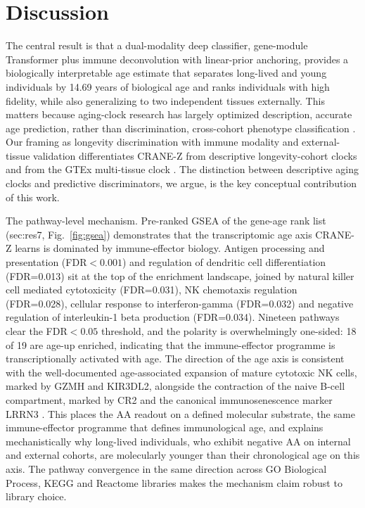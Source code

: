 \documentclass[11pt,a4paper]{article}
\begin{document}
\section{Discussion}\label{sec:disc}
The central result is that a dual-modality deep classifier, gene-module Transformer plus immune deconvolution with linear-prior anchoring, provides a biologically interpretable age estimate that separates long-lived and young individuals by 14.69 years of biological age and ranks individuals with high fidelity, while also generalizing to two independent tissues externally. This matters because aging-clock research has largely optimized description, accurate age prediction, rather than discrimination, cross-cohort phenotype classification \cite{mamoshina2019applications,frenk2021mechanistic,bergsma2021centenarian,liu2023immune,zhang2023clock}. Our framing as longevity discrimination with immune modality and external-tissue validation differentiates CRANE-Z from descriptive longevity-cohort clocks and from the GTEx multi-tissue clock \cite{orange2026brief}. The distinction between descriptive aging clocks and predictive discriminators, we argue, is the key conceptual contribution of this work.

The pathway-level mechanism. Pre-ranked GSEA of the gene-age rank list (sec:res7, Fig.~\ref{fig:gsea}) demonstrates that the transcriptomic age axis CRANE-Z learns is dominated by immune-effector biology. Antigen processing and presentation (FDR$<0.001$) and regulation of dendritic cell differentiation (FDR=0.013) sit at the top of the enrichment landscape, joined by natural killer cell mediated cytotoxicity (FDR=0.031), NK chemotaxis regulation (FDR=0.028), cellular response to interferon-gamma (FDR=0.032) and negative regulation of interleukin-1 beta production (FDR=0.034). Nineteen pathways clear the FDR$<0.05$ threshold, and the polarity is overwhelmingly one-sided: 18 of 19 are age-up enriched, indicating that the immune-effector programme is transcriptionally activated with age. The direction of the age axis is consistent with the well-documented age-associated expansion of mature cytotoxic NK cells, marked by GZMH and KIR3DL2, alongside the contraction of the naive B-cell compartment, marked by CR2 and the canonical immunosenescence marker LRRN3 \cite{franceschi2018inflammaging,goronzy2017fifty,fulop2018immunosenescence,nikolich2008ageing,pawelec2018conundrum,weng2006aging,shaw2010aging,solana2012innate,lopez2013hallmarks,lopez2023hallmarks}. This places the AA readout on a defined molecular substrate, the same immune-effector programme that defines immunological age, and explains mechanistically why long-lived individuals, who exhibit negative AA on internal and external cohorts, are molecularly younger than their chronological age on this axis. The pathway convergence in the same direction across GO Biological Process, KEGG and Reactome libraries makes the mechanism claim robust to library choice.
\end{document}
